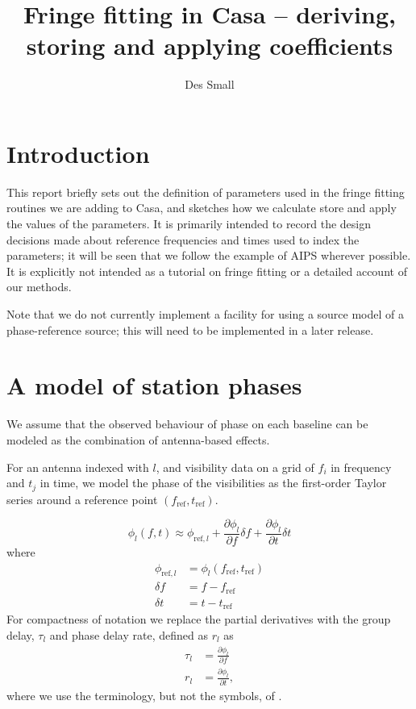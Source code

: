 \documentclass[11pt, twoside, a4paper]{article}
\author[1]{Des Small}
\affil[1]{JIVE}
\title{Fringe fitting in Casa -- deriving, storing and applying coefficients}
\begin{document}
\sloppy
\maketitle
\lstset{basicstyle=\ttfamily\footnotesize,breaklines=true}

\section{Introduction}
This report briefly sets out the definition of parameters used in the
fringe fitting routines we are adding to Casa, and sketches how we
calculate store and apply the values of the parameters. It is primarily
intended to record the design decisions made about reference
frequencies and times used to index the parameters; it will be seen
that we follow the example of AIPS wherever possible. It is explicitly
not intended as a tutorial on fringe fitting or a detailed account of
our methods.

Note that we do not currently implement a facility for using a source
model of a phase-reference source; this will need to be implemented in
a later release.

\section{A model of station phases}
We assume that the observed behaviour of phase on each baseline can be
modeled as the combination of antenna-based effects.

For an antenna indexed with $l$,
and visibility data on a grid of $f_i$
in frequency and $t_j$
in time, we model the phase of the visibilities as the first-order
Taylor series around a reference point $(f_\mathrm{ref}, t_\mathrm{ref})$.

\begin{equation}
  \phi_l(f, t) \approx \phi_{\mathrm{ref}, l} + 
  \frac{\partial \phi_l}{\partial f} \delta f +
  \frac{\partial \phi_l}{\partial t} \delta t
\end{equation}
where
\begin{align}\label{eq:pardef}
   \phi_{\mathrm{ref},l} &= \phi_l(f_{\mathrm{ref}}, t_{\mathrm{ref}}) \\
   \delta f &=  f - f_{\mathrm{ref}} \\
   \delta t &= t -t_{\mathrm{ref}}
\end{align}
For compactness of notation we replace the partial derivatives with the
group delay, $\tau_l$ and phase delay rate, defined as
$r_l$ as 
\begin{align}
  \tau_l &= \frac{\partial \phi_l}{\partial f} \\
  r_l &= \frac{\partial \phi_l}{\partial t},
\end{align}
where we use the terminology, but not the symbols, of \cite{petrov11}.
\end{document}
